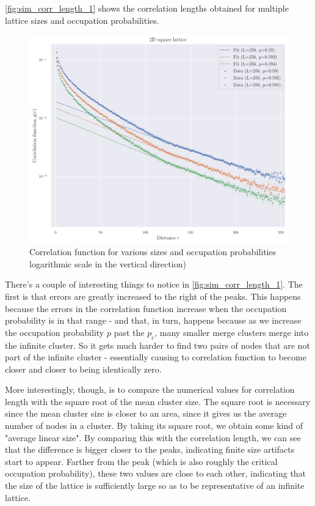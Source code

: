 \autoref{fig:sim_corr_length_1} shows the correlation lengths obtained for multiple lattice sizes and occupation probabilities. 


\begin{figure}[H]
  \includegraphics[width=\linewidth]{Images/sim_corr_func_2.png}
  \caption{Correlation function for various sizes and occupation probabilities logarithmic scale in the vertical direction)}
  \label{fig:sim_corr_func_1}
\end{figure}

There's a couple of interesting things to notice in \autoref{fig:sim_corr_length_1}. 
The first is that errors are greatly increased to the right of the peaks. This happens because the errors in the correlation function increase when the occupation probability is in that range - and that, in turn, happens because as we increase the occupation probability $p$ past the $p_c$, many smaller merge clusters merge into the infinite cluster. So it gets much harder to find two pairs of nodes that are not part of the infinite cluster - essentially causing to correlation function to become closer and closer to being identically zero.

More interestingly, though, is to compare the numerical values for correlation length with the square root of the mean cluster size. The square root is necessary since the mean cluster size is closer to an area, since it gives us the average number of nodes in a cluster. By taking its square root, we obtain some kind of "average linear size". By comparing this with the correlation length, we can see that the difference is bigger closer to the peaks, indicating finite size artifacts start to appear. Farther from the peak (which is also roughly the critical occupation probability), these two values are close to each other, indicating that the size of the lattice is sufficiently large so as to be representative of an infinite lattice. 



